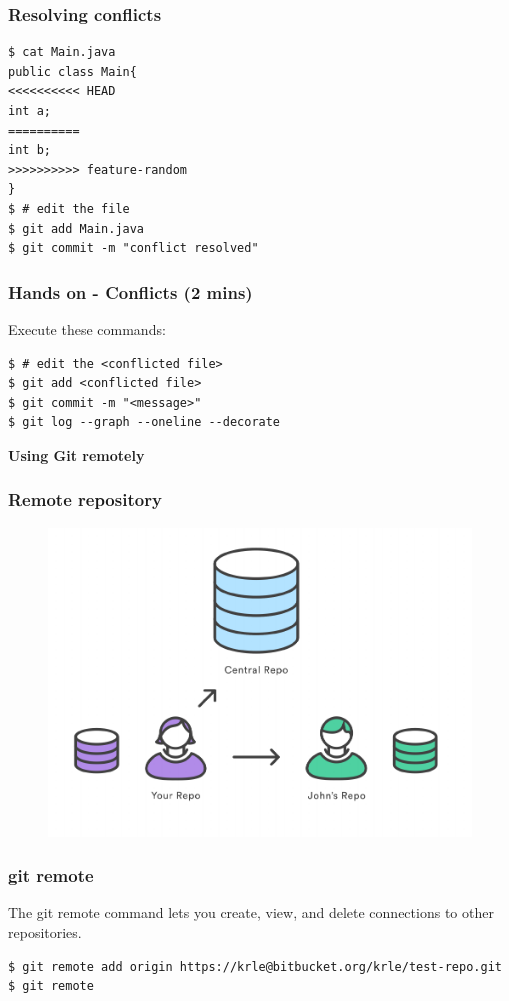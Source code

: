 \documentclass{beamer}
\begin{document}
\begin{frame}[fragile]
\frametitle{Resolving conflicts}
\begin{lstlisting}
$ cat Main.java
public class Main{
<<<<<<<<<< HEAD
int a;
==========
int b;
>>>>>>>>>> feature-random
}
$ # edit the file
$ git add Main.java
$ git commit -m "conflict resolved"
\end{lstlisting}

\end{frame}

\begin{frame}[fragile]
\frametitle{Hands on - Conflicts (2 mins)}

Execute these commands:

\begin{lstlisting}
$ # edit the <conflicted file>
$ git add <conflicted file>
$ git commit -m "<message>"
$ git log --graph --oneline --decorate
\end{lstlisting}
\end{frame}


\begin{frame}
\LARGE	
\textbf{Using Git remotely}
\end{frame}

\begin{frame}
\frametitle{Remote repository}

\begin{figure}
\includegraphics[scale=0.6]{figures/06.pdf}
\end{figure}

\end{frame}


\begin{frame}[fragile]
\frametitle{git remote}

The git remote command lets you create, view, and delete connections
to other repositories.

\begin{lstlisting}
$ git remote add origin https://krle@bitbucket.org/krle/test-repo.git
$ git remote
\end{lstlisting}
\end{frame}
\end{document}
